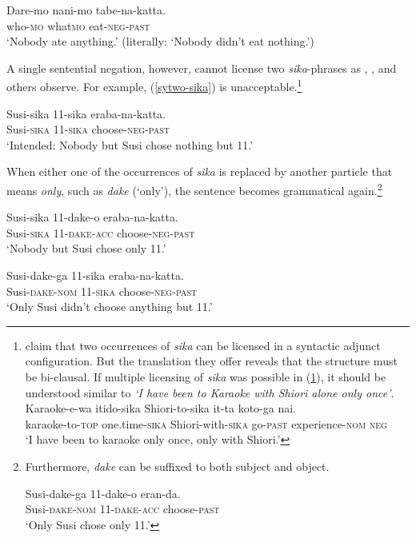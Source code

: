 \documentclass[output=paper,colorlinks,citecolor=brown,
]{langscibook}
\def\M#1{\textsc{#1}}
\begin{document}
\ea \label{syex:negconc}
 \gll Dare-mo nani-mo tabe-na-katta.\\
who-\M{mo} what\M{mo} eat-\M{neg}-\M{past}\\
\glt `Nobody ate anything.' (literally: `Nobody didn't eat nothing.')\z

A single sentential negation, however, cannot license two \emph{sika}-phrases as \cite{aoyagi94}, \cite{kawahara08a}, \cite{miyagawa16a} and others observe.  
For example, (\ref{sytwo-sika}) is unacceptable.\footnote{\cite[(28b)]{miyagawa16a} claim that two occurrences of \emph{sika} can be licensed in a syntactic adjunct configuration.  But the translation they offer reveals that the structure must be bi-clausal.  If multiple licensing of \emph{sika} was possible in (\ref{syex:miyag}), it should be understood similar to \emph{`I have been to Karaoke with Shiori alone only once'}.
\ea \label{syex:miyag}
\gll Karaoke-e-wa itido-sika Shiori-to-sika it-ta koto-ga nai.\\ karaoke-to-\M{top} one.time-\M{sika} Shiori-with-\M{sika} go-\M{past} experience-\M{nom} \M{neg}\\
\glt ‘I have been to karaoke only once, only with Shiori.’ 
\z
}

\ea \label{sytwo-sika}
\gll *Susi-sika 11-sika eraba-na-katta.\\
Susi-\M{sika} 11-\M{sika} choose-\M{neg}-\M{past}\\
\trans `Intended: Nobody but Susi chose nothing but 11.'\z

When either one of the occurrences of \emph{sika} is replaced by another particle that means \emph{only}, such as \emph{dake} (`only'), the sentence becomes grammatical again.\footnote{Furthermore, \emph{dake} can be suffixed to both subject and object.

\ea \gll Susi-dake-ga 11-dake-o eran-da.\\
Susi-\M{dake}-\M{nom} 11-\M{dake}-\M{acc} choose-\M{past}\\
\glt `Only Susi chose only 11.'\z}

\ea \gll Susi-sika 11-dake-o eraba-na-katta.\\
Susi-\M{sika} 11-\M{dake}-\M{acc} choose-\M{neg}-\M{past}\\
\glt `Nobody but Susi chose only 11.'\z

\ea \gll Susi-dake-ga 11-sika eraba-na-katta.\\
Susi-\M{dake}-\M{nom} 11-\M{sika} choose-\M{neg}-\M{past}\\
\glt `Only Susi didn't choose anything but 11.'\z
\end{document}
